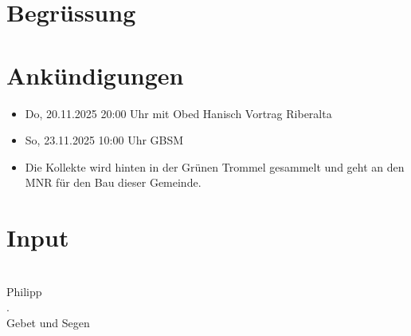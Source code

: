 \documentclass{mybib}
\begin{document}
\section{Begrüssung}

\beten{}


\section{Ankündigungen}
\begin{itemize}
    \item {} Do, 20.11.2025 20:00 Uhr mit Obed Hanisch Vortrag Riberalta
    \item {} So, 23.11.2025 10:00 Uhr GBSM
    \item Die Kollekte wird hinten in der Grünen Trommel gesammelt und geht an den MNR für den Bau dieser Gemeinde.
\end{itemize}

\section{ Input }     
    
    \\

    Philipp\\
    
    .\\
    
    Gebet und Segen\\
\end{document}
